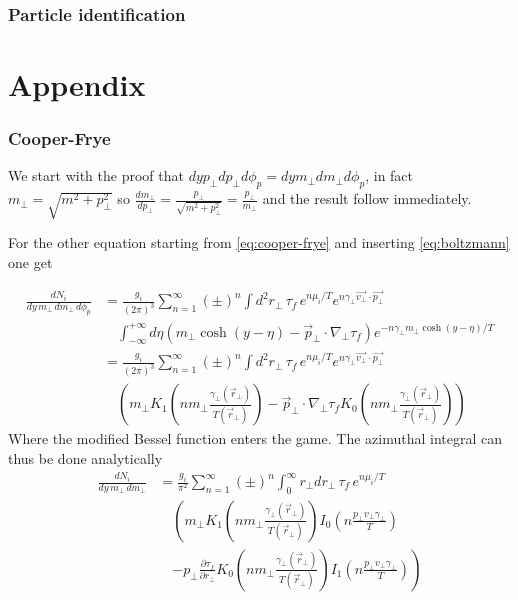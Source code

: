\documentclass[12pt,a4paper]{book}
\begin{document}
    \subsection{Particle identification}
	
	
	\chapter{Appendix}
	
	\appendix
	\subsection{Cooper-Frye}
	We start with the proof that $dy p_\perp dp_\perp d\phi_p = dy m_\perp dm_\perp d\phi_p$, in fact $m_\perp=\sqrt{m^2 + p_\perp^2}$ so $\frac{dm_\perp}{dp_\perp}= \frac{p_\perp}{\sqrt{m^2 + p_\perp^2}} = \frac{p_\perp}{m_\perp}$ and the result follow immediately.
	
	For the other equation starting from \ref{eq:cooper-frye} and inserting \ref{eq:boltzmann} one get
	
	\begin{equation}
		\begin{aligned}
			\frac{d N_i}{dy\, m_\perp\, dm_\perp\, d\phi_p} &= \frac{g_i}{(2\pi)^3} \sum_{n=1}^{\infty} (\pm)^n \int d^2 r_\perp \, \tau_f \, e^{n\mu_i/T} e^{n\gamma_\perp \vec{v_\perp} \cdot \vec{p_\perp}} \\
			& \quad \int_{-\infty}^{+\infty} d\eta \left(m_\perp \cosh(y-\eta) - \vec{p}_\perp \cdot \nabla_\perp \tau_f \right) e^{-n \gamma_\perp m_\perp \cosh(y-\eta)/T} \\
			&= \frac{g_i}{(2\pi)^3} \sum_{n=1}^{\infty} (\pm)^n \int d^2 r_\perp \, \tau_f \, e^{n\mu_i/T} e^{n\gamma_\perp \vec{v_\perp} \cdot \vec{p_\perp}} \\
			& \quad \left( m_\perp K_1\left(n m_\perp \frac{\gamma_\perp(\vec{r}_\perp)}{T(\vec{r}_\perp)}\right) - \vec{p}_\perp \cdot \nabla_\perp \tau_f K_0\left(n m_\perp \frac{\gamma_\perp(\vec{r}_\perp)}{T(\vec{r}_\perp)}\right) \right)
		\end{aligned}
	\end{equation}
	Where the modified Bessel function enters the game. The azimuthal integral can thus be done analytically
	\begin{equation}
		\begin{aligned}
			\frac{d N_i}{dy\, m_\perp\, dm_\perp} &= \frac{g_i}{\pi^2} \sum_{n=1}^{\infty} (\pm)^n \int_{0}^{\infty} r_\perp dr_\perp \, \tau_f \, e^{n\mu_i/T} \\
			& \quad \left( m_\perp K_1\left(n m_\perp \frac{\gamma_\perp(\vec{r}_\perp)}{T(\vec{r}_\perp)}\right) I_0\left(n \frac{p_\perp v_\perp \gamma_\perp}{T}\right) \right. \\
			& \quad \left. - p_\perp \frac{\partial \tau_f}{\partial r_\perp} K_0\left(n m_\perp \frac{\gamma_\perp(\vec{r}_\perp)}{T(\vec{r}_\perp)}\right) I_1\left(n \frac{p_\perp v_\perp \gamma_\perp}{T}\right) \right)
		\end{aligned}
	\end{equation}
	
\end{document}
